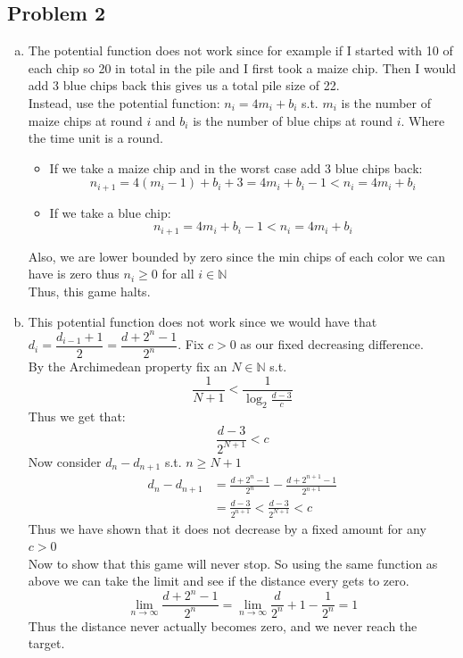 \documentclass[12pt, letterpaper]{article}
\theoremstyle{definition}
\newcommand{\N}{\mathbb{N}}
\begin{document}
\subsection*{Problem 2}
\begin{enumerate}[(a)]
    \item The potential function does not work since for example if I started with 10 of each chip so 20 in total in the pile and I first took a maize chip. Then I would add 3 blue chips back this gives us a total pile size of 22.\\
    Instead, use the potential function: $n_i=4m_i+b_i$ s.t. $m_i$ is the number of maize chips at round $i$ and $b_i$ is the number of blue chips at round $i$. Where the time unit is a round.
    \begin{itemize}
        \item If we take a maize chip and in the worst case add 3 blue chips back:
        \[n_{i+1}=4(m_i-1)+b_i+3=4m_i+b_i-1 < n_i=4m_i+b_i\]
        \item If we take a blue chip:
        \[n_{i+1}=4m_i+b_i-1 < n_i=4m_i+b_i\]
    \end{itemize}
    Also, we are lower bounded by zero since the min chips of each color we can have is zero thus $n_i \geq 0$ for all $i \in \N$\\
    Thus, this game halts.
    \item This potential function does not work since we would have that $d_i=\dfrac{d_{i-1}+1}{2}=\dfrac{d+2^n-1}{2^n}$. Fix $c>0$ as our fixed decreasing difference.\\
    By the Archimedean property fix an $N \in \N$ s.t. \[\frac{1}{N+1} < \frac{1}{\log_2\frac{d-3}{c}}\]
    Thus we get that:
    \[\frac{d-3}{2^{N+1}} < c\]
    Now consider $d_{n}-d_{n+1}$ s.t. $n \geq N+1$\\
    \begin{align*}
        d_{n}-d_{n+1}&=\frac{d+2^n-1}{2^n}-\frac{d+2^{n+1}-1}{2^{n+1}}\\
        &=\frac{d-3}{2^{n+1}}<\frac{d-3}{2^{N+1}}<c
    \end{align*}
    Thus we have shown that it does not decrease by a fixed amount for any $c >0$\\
    Now to show that this game will never stop. So using the same function as above we can take the limit and see if the distance every gets to zero.
    \[\lim_{n \to \infty}\frac{d+2^n-1}{2^n}=\lim_{n \to \infty}\frac{d}{2^n}+1-\frac{1}{2^n}=1\]
    Thus the distance never actually becomes zero, and we never reach the target.
\end{enumerate}
\end{document}

